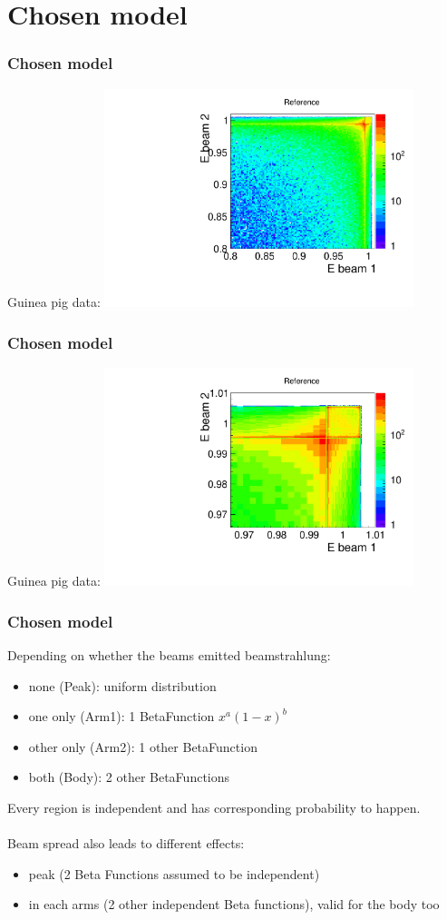 \documentclass[handout]{beamer}
\begin{document}
\section{Chosen model}
\begin{frame}
\frametitle{Chosen model}
Guinea pig data:
\centering
\includegraphics[width=9cm]{Reference}
\end{frame}
\begin{frame}
\frametitle{Chosen model}
Guinea pig data:
\centering
\includegraphics[width=9cm]{Reference_zoomed}
\end{frame}
\begin{frame}
\frametitle{Chosen model}
Depending on whether the beams emitted beamstrahlung: 
\begin{itemize}
  \item none (Peak): uniform distribution
  \item one only (Arm1): 1 BetaFunction $x^a(1-x)^b$
  \item other only (Arm2): 1 other BetaFunction
  \item both (Body): 2 other BetaFunctions
\end{itemize}
Every region is independent and has corresponding probability to happen.\\
~\\
Beam spread also leads to different effects:
\begin{itemize}
  \item peak (2 Beta Functions assumed to be independent)
  \item in each arms (2 other independent Beta functions), valid for the body
  too
\end{itemize}

\end{frame}
\end{document}

